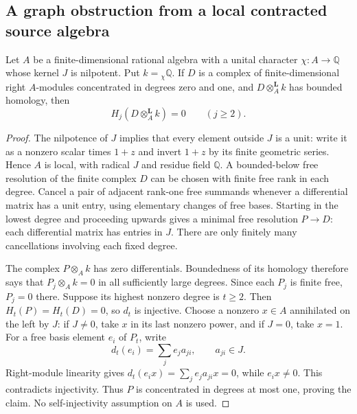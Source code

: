 \subsection{A graph obstruction from a local contracted source algebra}

\begin{lemma}
\label{CP2:A-local-two-term-derived-amplitude}
Let $A$ be a finite-dimensional rational algebra with a unital character
$\chi:A\to\mathbb Q$ whose kernel $J$ is nilpotent.  Put
$k={}_\chi\mathbb Q$.  If $D$ is a complex of finite-dimensional right
$A$-modules concentrated in degrees zero and one, and
$D\otimes_A^{\mathbf L}k$ has bounded homology, then
\[
 H_j(D\otimes_A^{\mathbf L}k)=0\qquad(j\ge2).
\]
\end{lemma}
\begin{proof}
The nilpotence of $J$ implies that every element outside $J$ is a unit:
write it as a nonzero scalar times $1+z$ and invert $1+z$ by its finite
geometric series.  Hence $A$ is local, with radical $J$ and residue field
$\mathbb Q$.  A bounded-below free resolution of the finite complex $D$
can be chosen with finite free rank in each degree.  Cancel a pair of
adjacent rank-one free summands whenever a differential matrix has a
unit entry, using elementary changes of free bases.  Starting in the
lowest degree and proceeding upwards gives a minimal free resolution
$P\to D$: each differential matrix has entries in $J$.
There are only finitely many cancellations involving each fixed degree.

The complex $P\otimes_A k$ has zero differentials.  Boundedness of its
homology therefore says that $P_j\otimes_A k=0$ in all sufficiently
large degrees.  Since each $P_j$ is finite free, $P_j=0$ there.
Suppose its highest nonzero degree is $t\ge2$.  Then $H_t(P)=H_t(D)=0$,
so $d_t$ is injective.  Choose a nonzero $x\in A$ annihilated on the
left by $J$: if $J\ne0$, take $x$ in its last nonzero power, and if
$J=0$, take $x=1$.  For a free basis element $e_i$ of $P_t$, write
\[
 d_t(e_i)=\sum_j e_j a_{ji},\qquad a_{ji}\in J.
\]
Right-module linearity gives
$d_t(e_i x)=\sum_j e_j a_{ji}x=0$, while $e_i x\ne0$.
This contradicts injectivity.  Thus $P$ is concentrated in degrees at
most one, proving the claim.  No self-injectivity assumption on $A$ is
used.
\end{proof}

